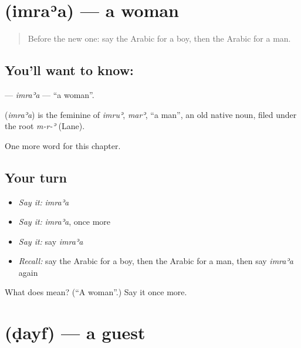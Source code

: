 \section[\texorpdfstring{\ar{امرأة} (imraʾa)}{امرأة (imraʾa)}]{ (imraʾa) — a woman}

\label{lesson:AR-C56-imraa}



\begin{quote}
Before the new one: say the Arabic for a boy, then the Arabic for a man.
\end{quote}

\subsection*{You'll want to know: }
\textbf{} — \emph{imraʾa} — \textquotedblleft{}a woman\textquotedblright{}.

\begin{cousinweb}
\textbf{} (\emph{imraʾa}) is the feminine of \emph{imruʾ}, \emph{marʾ}, \textquotedblleft{}a man\textquotedblright{}, an old native noun, filed under the root \emph{m-r-ʾ} (Lane).
\end{cousinweb}

\begin{grammarlens}[title={What you've built}]
One more word for this chapter.
\end{grammarlens}

\subsection*{Your turn}
\begin{itemize}
\raggedright
  \item \emph{Say it:} \emph{imraʾa}
  \item \emph{Say it:} \emph{imraʾa}, once more
  \item \emph{Say it:} say \emph{imraʾa}
  \item \emph{Recall:} say the Arabic for a boy, then the Arabic for a man, then say \emph{imraʾa} again
\end{itemize}

\begin{tcolorbox}[breakable,colback=teal!4,colframe=teal!35!black,title={Before you move on}]
What does  mean? (\textquotedblleft{}A woman\textquotedblright{}.) Say it once more.
\end{tcolorbox}
\section[\texorpdfstring{\ar{ضيف} (ḍayf)}{ضيف (ḍayf)}]{ (ḍayf) — a guest}


